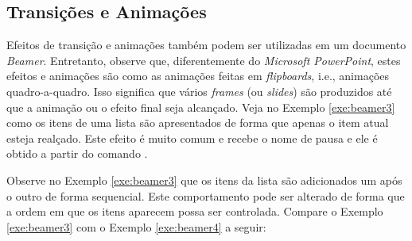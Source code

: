 \subsection{Transições e Animações}
\label{sec:trans_anima}

Efeitos de transição e animações também podem ser utilizadas em um documento \textit{Beamer}. Entretanto, observe que, diferentemente do \textit{Microsoft PowerPoint}, estes efeitos e animações são como as animações feitas em \textit{flipboards}, i.e., animações quadro-a-quadro. Isso significa que vários \textit{frames} (ou \textit{slides}) são produzidos até que a animação ou o efeito final seja alcançado. Veja no Exemplo \ref{exe:beamer3} como os itens de uma lista são apresentados de forma que apenas o item atual esteja realçado. Este efeito é muito comum e recebe o nome de pausa e ele é obtido a partir do comando \texttt{\pause}.



Observe no Exemplo \ref{exe:beamer3} que os itens da lista são adicionados um após o outro de forma sequencial. Este comportamento pode ser alterado de forma que a ordem em que os itens aparecem possa ser controlada. Compare o Exemplo \ref{exe:beamer3} com o Exemplo \ref{exe:beamer4} a seguir:

